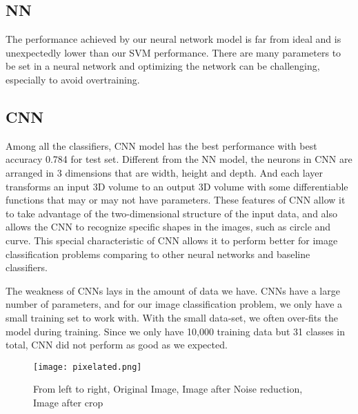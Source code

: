 \documentclass[conference]{IEEEtran}
\begin{document}
\subsection{NN}
The performance achieved by our neural network model is far from ideal and is unexpectedly lower than our SVM performance. There are many parameters to be set in a neural network and optimizing the network can be challenging, especially to avoid overtraining. 

\subsection{CNN}
Among all the classifiers, CNN model has the best performance with best accuracy 0.784 for test set. Different from the NN model, the neurons in CNN are arranged in 3 dimensions that are width, height and depth. And each layer transforms an input 3D volume to an output 3D volume with some differentiable functions that may or may not have parameters. These features of CNN allow it to take advantage of the two-dimensional structure of the input data, and also allows the CNN to recognize specific shapes in the images, such as circle and curve. This special characteristic of CNN allows it to perform better for image classification problems comparing to other neural networks and  baseline classifiers.

The weakness of CNNs lays in the amount of data we have. CNNs have a large number of parameters, and for our image classification problem, we only have a small training set to work with. With the small data-set, we often over-fits the model during training. Since  we  only  have  10,000 training data but 31 classes in total, CNN did not perform as good as we expected.



\begin{figure}[!htbp]
\centering
\texttt{[image: pixelated.png]}
\caption{From left to right, Original Image, Image after Noise reduction, Image after crop}
\end{figure}
\end{document}
